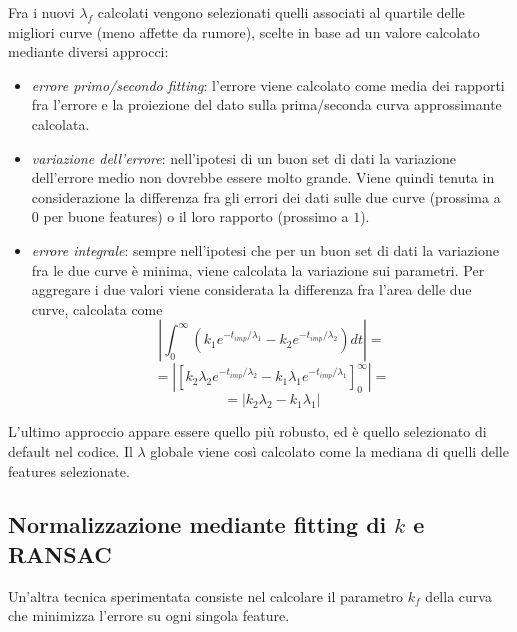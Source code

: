 \documentclass[12pt]{report}
\begin{document}
\noindent Fra i nuovi $\lambda_f$ calcolati vengono selezionati quelli associati al quartile delle migliori curve (meno affette da rumore), scelte in base ad un valore calcolato mediante diversi approcci:

\begin{itemize}
	\item	\emph{errore primo/secondo fitting}: l'errore viene calcolato come media dei rapporti fra l'errore e la proiezione del dato sulla prima/seconda curva approssimante calcolata.
	\item	\emph{variazione dell'errore}: nell'ipotesi di un buon set di dati la variazione dell'errore medio non dovrebbe essere molto grande. Viene quindi tenuta in considerazione la differenza fra gli errori dei dati sulle due curve (prossima a $0$ per buone features) o il loro rapporto (prossimo a $1$).
	\item	\emph{errore integrale}: sempre nell'ipotesi che per un buon set di dati la variazione fra le due curve \`e minima, viene calcolata la variazione sui parametri. Per aggregare i due valori viene considerata la differenza fra l'area delle due curve, calcolata come $$\left|\int^{\infty}_0\left(k_1e^{-t_{imp}/\lambda_1} - k_2e^{-t_{imp}/\lambda_2}\right)dt\right| =$$ $$= \left|\left[ k_2\lambda_2e^{-t_{imp}/\lambda_2} - k_1\lambda_1e^{-t_{imp}/\lambda_1} \right]^\infty_0\right| =$$ $$ = \left|k_2\lambda_2 - k_1\lambda_1\right|$$
\end{itemize}

\noindent L'ultimo approccio appare essere quello pi\`u robusto, ed \`e quello selezionato di default nel codice. Il $\lambda$ globale viene cos\`i calcolato come la mediana di quelli delle features selezionate.




\subsection{Normalizzazione mediante fitting di $k$ e RANSAC}
\label{sect:rans}

\noindent Un'altra tecnica sperimentata consiste nel calcolare il parametro $k_f$ della curva che minimizza l'errore su ogni singola feature.\\
\end{document}
